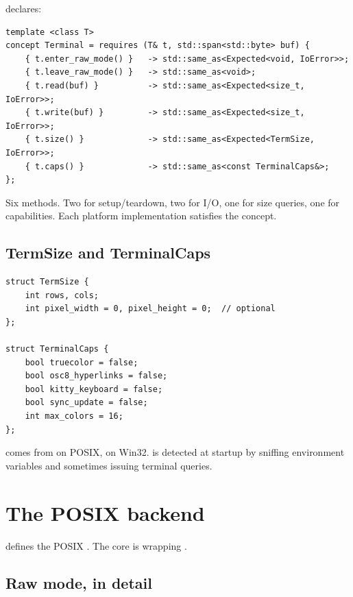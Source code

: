  declares:

\begin{lstlisting}
template <class T>
concept Terminal = requires (T& t, std::span<std::byte> buf) {
    { t.enter_raw_mode() }   -> std::same_as<Expected<void, IoError>>;
    { t.leave_raw_mode() }   -> std::same_as<void>;
    { t.read(buf) }          -> std::same_as<Expected<size_t, IoError>>;
    { t.write(buf) }         -> std::same_as<Expected<size_t, IoError>>;
    { t.size() }             -> std::same_as<Expected<TermSize, IoError>>;
    { t.caps() }             -> std::same_as<const TerminalCaps&>;
};
\end{lstlisting}

Six methods. Two for setup/teardown, two for I/O, one for size
queries, one for capabilities. Each platform implementation
satisfies the concept.

\subsection*{TermSize and TerminalCaps}

\begin{lstlisting}
struct TermSize {
    int rows, cols;
    int pixel_width = 0, pixel_height = 0;  // optional
};

struct TerminalCaps {
    bool truecolor = false;
    bool osc8_hyperlinks = false;
    bool kitty_keyboard = false;
    bool sync_update = false;
    int max_colors = 16;
};
\end{lstlisting}

 comes from  on POSIX,
 on Win32. 
is detected at startup by sniffing environment variables and
sometimes issuing terminal queries.

\section{The POSIX backend}

 defines the POSIX
. The core is wrapping .

\subsection*{Raw mode, in detail}

